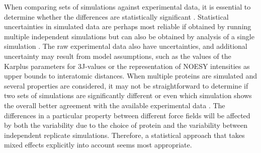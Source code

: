 \documentclass[9pt,review]{livecoms}
\newcommand{\githubrepository}{\url{https://github.com/openforcefield/review-protein-benchmark-datasets}}  %
\begin{document}
When comparing sets of simulations against experimental data, it is essential to determine whether the differences are statistically significant \cite{van_gunsteren_validation_2018}.
Statistical uncertainties in simulated data are perhaps most reliable if obtained by running multiple independent simulations but can also be obtained by analysis of a single simulation \cite{grossfield_best_2019}.
The raw experimental data also have uncertainties, and additional uncertainty may result from model assumptions, such as the values of the Karplus parameters for 3J-values or the representation of NOESY intensities as upper bounds to interatomic distances.
When multiple proteins are simulated and several properties are considered, it may not be straightforward to determine if two sets of simulations are significantly different or even which simulation shows the overall better agreement with the available experimental data \cite{setz_molecular_2018,wassenaar_effect_2006,villa_how_2007}.
The differences in a particular property between different force fields will be affected by both the variability due to the choice of protein and the variability between independent replicate simulations.
Therefore, a statistical approach that takes mixed effects explicitly into account seems most appropriate.

%


%
\end{document}
